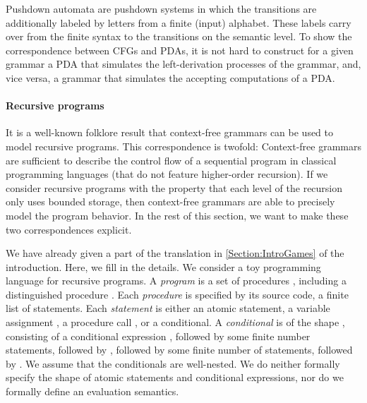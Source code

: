 \documentclass[../../diss.tex]{subfiles}
\begin{document}
Pushdown automata are pushdown systems in which the transitions are additionally labeled by letters from a finite (input) alphabet.
These labels carry over from the finite syntax to the transitions on the semantic level.
To show the correspondence between CFGs and PDAs, it is not hard to construct for a given grammar a PDA that simulates the left-derivation processes of the grammar, and, vice versa, a grammar that simulates the accepting computations of a PDA.\@

\paragraph{Recursive programs}

It is a well-known folklore result that context-free grammars can be used to model recursive programs.
This correspondence is twofold:
Context-free grammars are sufficient to describe the control flow of a sequential program in classical programming languages (that do not feature higher-order recursion).
If we consider recursive programs with the property that each level of the recursion only uses bounded storage, then context-free grammars are able to precisely model the program behavior.
In the rest of this section, we want to make these two correspondences explicit.

We have already given a part of the translation in \cref{Section:IntroGames} of the introduction.
Here, we fill in the details.
We consider a toy programming language for recursive programs.
A \emph{program} is a set of procedures , including a distinguished procedure .
Each \emph{procedure} is specified by its source code, a finite list of statements.
Each \emph{statement} is either an atomic statement, \eg a variable assignment , a procedure call , or a conditional.
A \emph{conditional} is of the shape , consisting of a conditional expression , followed by some finite number statements, followed by , followed by some finite number of statements, followed by .
We assume that the conditionals are well-nested.
We do neither formally specify the shape of atomic statements and conditional expressions, nor do we formally define an evaluation semantics.
\end{document}
